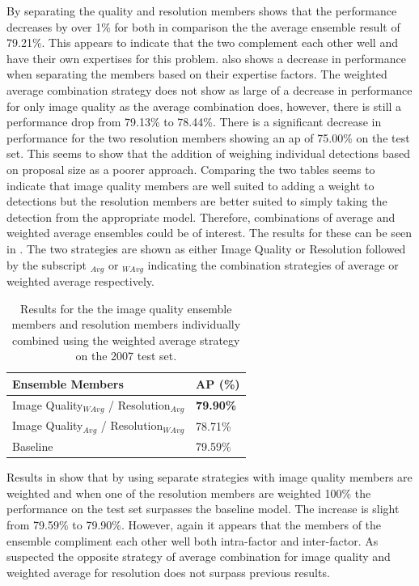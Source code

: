 By separating the quality and resolution members  shows that the performance decreases by over 1\% for both in comparison the the average ensemble result of 79.21\%. This appears to indicate that the two complement each other well and have their own expertises for this problem.  also shows a decrease in performance when separating the members based on their expertise factors. The weighted average combination strategy does not show as large of a decrease in performance for only image quality as the average combination does, however, there is still a performance drop from 79.13\% to 78.44\%. There is a significant decrease in performance for the two resolution members showing an \gls{ap} of 75.00\% on the test set. This seems to show that the addition of weighing individual detections based on proposal size as a poorer approach. Comparing the two tables seems to indicate that image quality members are well suited to adding a weight to detections but the resolution members are better suited to simply taking the detection from the appropriate model. Therefore, combinations of average and weighted average ensembles could be of interest. The results for these can be seen in . The two strategies are shown as either Image Quality or Resolution followed by the subscript $_{Avg}$ or $_{WAvg}$ indicating the combination strategies of average or weighted average respectively. 

\begin{table}[h]
\centering
\caption{Results for the the image quality ensemble members and resolution members individually combined using the weighted average strategy on the 2007 test set.}
\label{tab:weandavgres}
\begin{tabular}{|l|l|}
\hline
\textbf{Ensemble Members}                  & \textbf{AP (\%)} \\ \hline
Image Quality$_{WAvg}$ / Resolution$_{Avg}$ & \textbf{79.90\%} \\ \hline
Image Quality$_{Avg}$ / Resolution$_{WAvg}$ & 78.71\% \\ \hline
Baseline                          & 79.59\% \\ \hline
\end{tabular}
\end{table}

Results in  show that by using separate strategies with image quality members are weighted and when one of the resolution members are weighted 100\% the performance on the test set surpasses the baseline model. The increase is slight from 79.59\% to 79.90\%. However, again it appears that the members of the ensemble compliment each other well both intra-factor and inter-factor. As suspected the opposite strategy of average combination for image quality and weighted average for resolution does not surpass previous results. 




